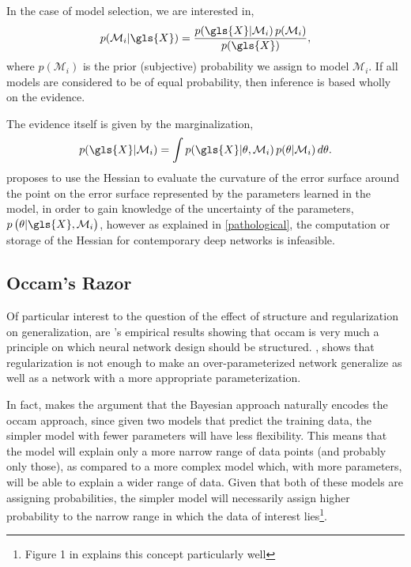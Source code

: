 \documentclass[thesis]{subfiles}
\begin{document}
In the case of model selection, we are interested in,
\begin{equation}
	p(\mathcal{M}_i|\gls{X}) = \frac{p(\gls{X}|\mathcal{M}_i)\,p(\mathcal{M}_i)}{p(\gls{X})},
\end{equation}
where $p(\mathcal{M}_i)$ is the prior (subjective) probability we assign to model $\mathcal{M}_i$. If all models are considered to be of equal probability, then inference is based wholly on the evidence.

The evidence itself is given by the marginalization,
\begin{equation}
	p(\gls{X}|\mathcal{M}_i) = \int p(\gls{X}|\mathbf{\theta},\mathcal{M}_i)\,p(\mathbf{\theta}|\mathcal{M}_i)\,d\mathbf{\theta}.
\end{equation}
 proposes to use the Hessian to evaluate the curvature of the error surface around the point on the error surface represented by the parameters learned in the model, in order to gain knowledge of the uncertainty of the parameters, \ie $p\left(\mathbf{\theta}|\gls{X},\mathcal{M}_i\right)$, however as explained in \cref{pathological}, the computation or storage of the Hessian for contemporary deep networks is infeasible.

\subsection{Occam's Razor}
Of particular interest to the question of the effect of structure and regularization on generalization, are \citeauthor{MacKay91}'s empirical results showing that \gls{occam} is very much a principle on which neural network design should be structured. \citet[]{MacKay91}, shows that regularization is not enough to make an over-parameterized network generalize as well as a network with a more appropriate parameterization.

In fact, \citeauthor{mackay1992practical} makes the argument that the Bayesian approach naturally encodes the \gls{occam} approach, since given two models that predict the training data, the simpler model with fewer parameters will have less flexibility. This means that the model will explain only a more narrow range of data points (and probably only those), as compared to a more complex model which, with more parameters, will be able to explain a wider range of data. Given that both of these models are assigning probabilities, the simpler model will necessarily assign higher probability to the narrow range in which the data of interest lies\footnote{Figure 1 in \citet{mackay1995} explains this concept particularly well}.
\end{document}
